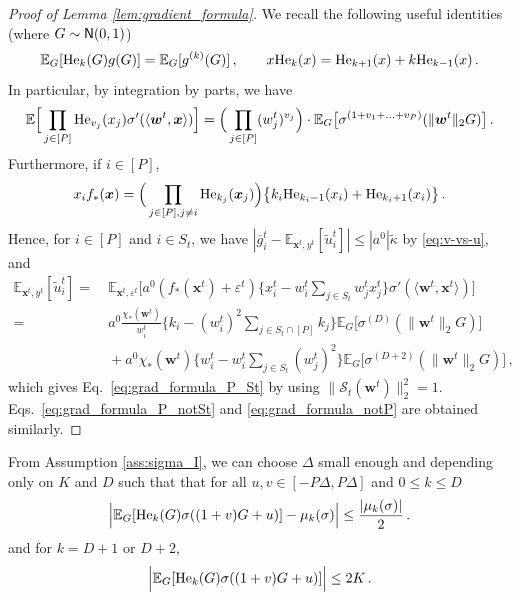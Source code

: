 \documentclass[11pt]{article}
\newcommand{\E}{\mathbb{E}}
\newcommand{\eps}{\varepsilon}
\newcommand{\<}{\langle}
\renewcommand{\>}{\rangle}
\theoremstyle{definition}
\def\bw{{\boldsymbol w}}
\def\bx{{\boldsymbol x}}
\def\cS{{\mathcal S}}
\def\normal{{\sf N}}
\def\normal{{\sf N}}
\def\normal{{\sf N}}
\def\He{{\rm He}}
\def\bw{{\boldsymbol w}}
\def\bx{{\boldsymbol x}}
\def\He{{\rm He}}
\def\normal{{\sf N}}
\def\cS{{\mathcal S}}
\def\eps{\varepsilon}
\def\og{\overline{g}}
\begin{document}
\begin{proof}[Proof of Lemma \ref{lem:gradient_formula}]
We recall the following useful identities (where $G \sim \normal (0,1)$)
\[
\E_G [ \He_k(G) g (G) ] = \E_G [g^{(k)} (G)]\, , \qquad  x \He_k (x) = \He_{k+1} (x) +k \He_{k-1} (x) \, .
\]
In particular, by integration by parts, we have
\[
\E \Big[ \prod_{ j \in [P]} \He_{v_j} (x_j ) \sigma ' ( \< \bw^t , \bx \> ) \Big] = \Big( \prod_{j \in [P]} (w_j^t)^{v_j} \Big) \cdot \E_{G} \big[ \sigma^{(1 + v_1 + \ldots + v_P)} (\| \bw^t \|_2 G ) \big] \, .
\]
Furthermore, if $i \in [P]$,
\[
x_i f_* (\bx) = \Big( \prod_{j \in [P], j \neq i} \He_{k_j} ( \bx_j)\Big) \big\{ k_i \He_{k_i - 1} (x_i) + \He_{k_i + 1} (x_i) \big\} \, .
\]
Hence, for $i \in [P]$ and $i \in S_t$, we have $|\og_i^t - \E_{\bx^t,y^t}[\tilde{u}_i^t]| \leq |a^0|\tilde{\kappa}$ by \eqref{eq:v-vs-u}, and
\[
\begin{aligned}
\E_{\bx^t,y^t}[\tilde{u}_i^t] =&~ \E_{\bx^t,\eps^t} \Big[ a^0 (f_* (\bx^t) + \eps^t) \Big\{ x_i^t - w_i^t \sum_{ j \in S_t} w_j^t x_j^t \Big\} \sigma ' ( \< \bw^t , \bx^t \> ) \Big] \\
=&~ a^0 \frac{\chi_* (\bw^t) }{w_i^t} \Big\{ k_i - (w_i^t)^2 \sum_{ j \in S_t \cap [P]} k_j \Big\}  \E_{G} \big[ \sigma^{(D)} (\| \bw^t \|_2 G ) \big] \\
&~+ a^0 \chi_* (\bw^t) \Big\{ w_i^t  - w_i^t \sum_{j \in S_t} (w_j^t)^2 \Big\} \E_{G} \big[ \sigma^{(D+2)} (\| \bw^t \|_2 G ) \big] \, ,
\end{aligned}
\]
which gives Eq.~\eqref{eq:grad_formula_P_St} by using $\| \cS_t (\bw^t) \|_2^2 = 1$. Eqs.~\eqref{eq:grad_formula_P_notSt} and \eqref{eq:grad_formula_notP} are obtained similarly.
\end{proof}


From Assumption \ref{ass:sigma_I}, we can choose $\Delta $ small enough and depending only on $K$ and $D$ such that that for all $u,v \in [-P\Delta,P\Delta]$ and $0 \leq k \leq D$
\begin{equation}\label{eq:choice_Delta_sigma}
 \Big\vert \E_{G} [ \He_k (G) \sigma ((1+v)G + u) ] - \mu_k (\sigma) \Big\vert \leq  \frac{|\mu_k (\sigma )|}{2}\, .
\end{equation}
and for $k =D+1$ or $D+2$,
\begin{equation}\label{eq:choice_Delta_sigma_2}
 \Big\vert \E_{G} [ \He_k (G) \sigma ((1+v)G + u) ] \Big\vert \leq  2K \, .
\end{equation}
\end{document}
